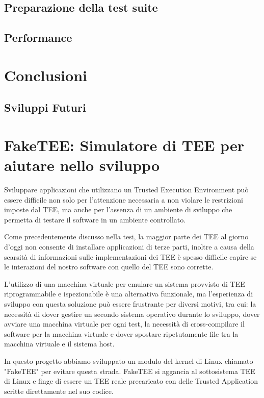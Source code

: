 \documentclass[12pt,italian]{report}
\begin{document}
\section{Preparazione della test suite}
\label{sec:preparazione-test-suite}

\section{Performance}
\label{sec:performance}

\chapter{Conclusioni}
\label{chap:conclusioni}

\section{Sviluppi Futuri}
\label{sec:sviluppi-futuri}

\appendix
\chapter{FakeTEE: Simulatore di TEE per aiutare nello sviluppo}
\label{chap:faketee}
Sviluppare applicazioni che utilizzano un Trusted Execution Environment può
essere difficile non solo per l'attenzione necessaria a non violare
le restrizioni imposte dal TEE, ma anche per l'assenza di un ambiente di
sviluppo che permetta di testare il software in un ambiente controllato.

Come precedentemente discusso nella tesi, la maggior parte dei TEE al giorno
d'oggi non consente di installare applicazioni di terze parti, inoltre
a causa della scarsità di informazioni sulle implementazioni dei TEE
è spesso difficile capire se le interazioni del nostro software con quello
del TEE sono corrette.

L'utilizzo di una macchina virtuale per emulare un sistema provvisto di TEE
riprogrammabile e ispezionabile è una alternativa funzionale, ma
l'esperienza di sviluppo con questa soluzione può essere frustrante per
diversi motivi, tra cui: la necessità di dover gestire un secondo sistema
operativo durante lo sviluppo, dover avviare una macchina virtuale per ogni
test, la necessità di cross-compilare il software per la macchina virtuale
e dover spostare ripetutamente file tra la macchina virtuale e il sistema
host.

In questo progetto abbiamo sviluppato un modulo del kernel di Linux chiamato
"FakeTEE" per evitare questa strada. FakeTEE si aggancia al sottosistema TEE
di Linux e finge di essere un TEE reale precaricato con delle
Trusted Application scritte direttamente nel suo codice.
\end{document}
